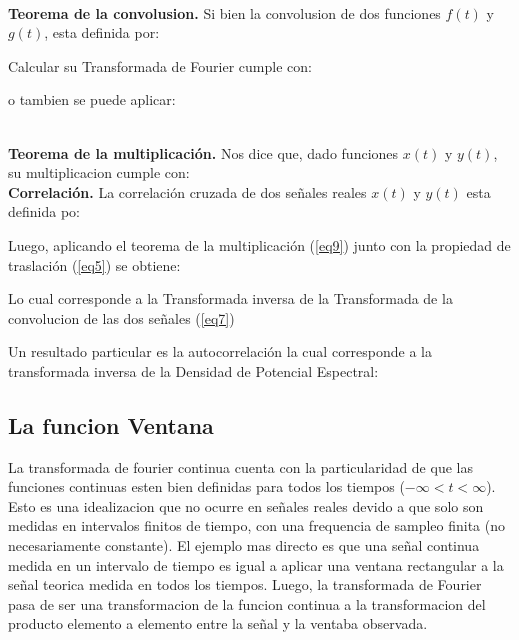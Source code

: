 \\
\textbf{Teorema de la convolusion.} Si bien la convolusion de dos funciones $f(t)$ y $g(t)$, esta definida por:


\newp Calcular su Transformada de Fourier cumple con:

\insertequation[\label{eq7}]{\FF[f * g] = \FF[f] \cdotp \FF[g]}

\newp o tambien se puede aplicar:

\insertequation[\label{eq8}]{\FF[f \cdotp g)] = \FF[f] * \FF[g]}
\\
\textbf{Teorema de la multiplicaci\'on.} Nos dice que, dado funciones $x(t)$ y $y(t)$, su multiplicacion cumple con:
\\
\textbf{Correlaci\'on.} La correlaci\'on cruzada de dos señales reales $x(t)$ y $y(t)$ esta definida po:


\newp Luego, aplicando el teorema de la multiplicaci\'on (\ref{eq9}) junto con la propiedad de traslaci\'on (\ref{eq5}) se obtiene:


\newp Lo cual corresponde a la Transformada inversa de la Transformada de la convolucion de las dos señales (\ref{eq7})


\newp Un resultado particular es la autocorrelaci\'on la cual corresponde a la transformada inversa de la Densidad de Potencial Espectral:


\subsection{La funcion Ventana}
\newp La transformada de fourier continua cuenta con la particularidad de que las funciones continuas esten bien definidas para todos los tiempos ($-\infty < t < \infty$). Esto es una idealizacion que no ocurre en señales reales devido a que solo son medidas en intervalos finitos de tiempo, con una frequencia de sampleo finita (no necesariamente constante). El ejemplo mas directo es que una señal continua medida en un intervalo de tiempo es igual a aplicar una ventana rectangular a la señal teorica medida en todos los tiempos.
\newp Luego, la transformada de Fourier pasa de ser una transformacion de la funcion continua a la transformacion del producto elemento a elemento entre la señal y la ventaba observada.


